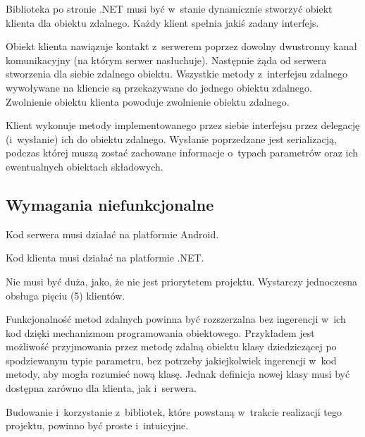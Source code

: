 \begin{description}

Biblioteka po stronie .NET musi być w~stanie dynamicznie stworzyć obiekt klienta dla obiektu zdalnego.
Każdy klient spełnia jakiś zadany interfejs.

Obiekt klienta nawiązuje kontakt z~serwerem poprzez dowolny dwustronny kanał komunikacyjny (na którym serwer nasłuchuje).
Następnie żąda od serwera stworzenia dla siebie zdalnego obiektu.
Wszystkie metody z~interfejsu zdalnego wywoływane na kliencie są przekazywane do jednego obiektu zdalnego.
Zwolnienie obiektu klienta powoduje zwolnienie obiektu zdalnego.

Klient wykonuje metody implementowanego przez siebie interfejsu przez delegację (i~wysłanie) ich do obiektu zdalnego.
Wysłanie poprzedzane jest serializacją, podczas której muszą zostać zachowane informacje o~typach parametrów oraz ich ewentualnych obiektach składowych.

\end{description}


\subsection{Wymagania niefunkcjonalne}

\begin{description}

Kod serwera musi działać na platformie Android.

Kod klienta musi działać na platformie .NET\@.

Nie musi być duża, jako, że nie jest priorytetem projektu. Wystarczy jednoczesna obsługa pięciu (5) klientów.

Funkcjonalność metod zdalnych powinna być rozszerzalna bez ingerencji w~ich kod dzięki mechanizmom programowania obiektowego.
Przykładem jest możliwość przyjmowania przez metodę zdalną obiektu klasy dziedziczącej po spodziewanym typie parametru, bez potrzeby jakiejkolwiek ingerencji w~kod metody, aby mogła rozumieć nową klasę.
Jednak definicja nowej klasy musi być dostępna zarówno dla klienta, jak i~serwera.

Budowanie i~korzystanie z~bibliotek, które powstaną w~trakcie realizacji tego projektu, powinno być proste i~intuicyjne.

\end{description}



